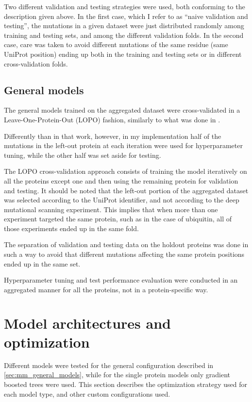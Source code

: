 Two different validation and testing strategies were used, both conforming to the description given above.
In the first case, which I refer to as ``naive validation and testing'', the mutations in a given dataset were just distributed randomly among training and testing sets, and among the different validation folds.
In the second case, care was taken to avoid different mutations of the same residue (same UniProt position) ending up both in the training and testing sets or in different cross-validation folds.

\subsection{General models}\label{sec:mm_general_models}
The general models trained on the aggregated dataset were cross-validated in a Leave-One-Protein-Out (LOPO) fashion, similarly to what was done in \textcite{Gray2018}.

Differently than in that work, however, in my implementation half of the mutations in the left-out protein at each iteration were used for hyperparameter tuning, while the other half was set aside for testing.

The LOPO cross-validation approach consists of training the model iteratively on all the proteins except one and then using the remaining protein for validation and testing.
It should be noted that the left-out portion of the aggregated dataset was selected according to the UniProt identifier, and not according to the deep mutational scanning experiment.
This implies that when more than one experiment targeted the same protein, such as in the case of ubiquitin, all of those experiments ended up in the same fold.

The separation of validation and testing data on the holdout proteins was done in such a way to avoid that different mutations affecting the same protein positions ended up in the same set.

Hyperparameter tuning and test performance evaluation were conducted in an aggregated manner for all the proteins, not in a protein-specific way.

\section{Model architectures and optimization}\label{sec:mm_optimization}
Different models were tested for the general configuration described in \autoref{sec:mm_general_models}, while for the single protein models only gradient boosted trees were used.
This section describes the optimization strategy used for each model type, and other custom configurations used.

